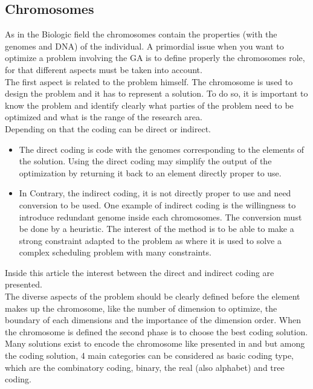 \subsection{Chromosomes} \label{par:Chromosomes}
As in the Biologic field the chromosomes contain the properties (with the genomes and DNA) of the individual.
A primordial issue when you want to optimize a problem involving the GA is to define properly the chromosomes role, for that different aspects must be taken into account.\\

The first aspect is related to the problem himself. The chromosome is used to design the problem and it has to represent a solution. To do so, it is important to know the problem and identify clearly what parties of the problem need to be optimized and what is the range of the research area. \\
Depending on that the coding can be direct or indirect.
\begin{itemize}
\item The direct coding is code with the genomes corresponding to the elements of the solution. Using the direct coding may simplify the output of the optimization by returning it back to an element directly proper to use.
\item  In Contrary, the indirect coding, it is not directly proper to use and need conversion to be used. One example of indirect coding is the willingness to introduce redundant genome inside each chromosomes.  The conversion must be done by a heuristic. The interest of the method is to be able  to make a strong constraint adapted to the problem as \cite{121*ronald1997,131*walters1995}  where it is used to solve a complex scheduling problem with many constraints. 
\end{itemize} 
 Inside this article the interest between the direct and indirect coding are presented.  \\ %
The diverse aspects of the problem should be clearly defined before the element makes up the chromosome, like  the number of dimension to optimize, the boundary of each dimensions and the importance of the dimension order. 
When the chromosome is defined the second phase is to choose the best coding solution. Many solutions exist to encode the chromosome like presented in \cite{131*walters1995} and \cite{123*owais2008}   but among the coding solution, 4 main categories can be considered as  basic coding type,  which are the combinatory coding, binary, the real (also alphabet) and tree coding.

